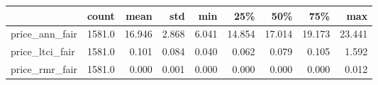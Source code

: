 \begin{tabular}{lrrrrrrrr}
\toprule
{} &   count &    mean &    std &    min &     25\% &     50\% &     75\% &     max \\
\midrule
price\_ann\_fair  &  1581.0 &  16.946 &  2.868 &  6.041 &  14.854 &  17.014 &  19.173 &  23.441 \\
price\_ltci\_fair &  1581.0 &   0.101 &  0.084 &  0.040 &   0.062 &   0.079 &   0.105 &   1.592 \\
price\_rmr\_fair  &  1581.0 &   0.000 &  0.001 &  0.000 &   0.000 &   0.000 &   0.000 &   0.012 \\
\bottomrule
\end{tabular}
